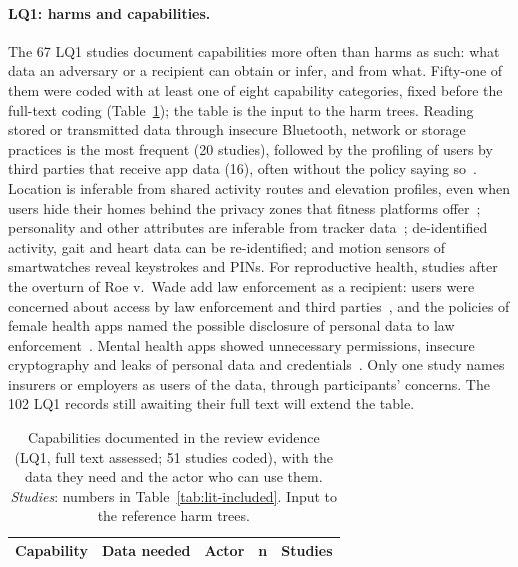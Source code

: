 \paragraph{LQ1: harms and capabilities.} The 67 LQ1 studies document
capabilities more often than harms as such: what data an adversary or a
recipient can obtain or infer, and from what. Fifty-one of them were coded with
at least one of eight capability categories, fixed before the full-text coding
(Table~\ref{tab:lit-capabilities}); the table is the input to the harm trees.
Reading stored or transmitted data through insecure Bluetooth, network or
storage practices is the most frequent (20 studies), followed by the profiling
of users by third parties that receive app data (16), often without the policy
saying
so~\parencite{huckvale2015unaddressed,huckvale2019assessment,grundy2019data,tangari2021mobile}.
Location is inferable from shared activity routes and elevation profiles, even
when users hide their homes behind the privacy zones that fitness platforms
offer~\parencite{hassan2018analysis,dhondt2022run}; personality and other
attributes are inferable from tracker data~\parencite{zufferey2023watch};
de-identified activity, gait and heart data can be re-identified; and motion
sensors of smartwatches reveal keystrokes and PINs. For reproductive health,
studies after the overturn of Roe v.~Wade add law enforcement as a recipient:
users were concerned about access by law enforcement and third
parties~\parencite{cao2024deleted}, and the policies of female health apps named
the possible disclosure of personal data to law
enforcement~\parencite{malki2024exploring}. Mental health apps showed
unnecessary permissions, insecure cryptography and leaks of personal data and
credentials~\parencite{iwaya2023privacy}. Only one study names insurers or
employers as users of the data, through participants' concerns. The 102 LQ1
records still awaiting their full text will extend the table.

\begin{table}[tbp]
\centering
\begin{singlespace}
\caption[Capabilities documented in the review evidence]{Capabilities
documented in the review evidence (LQ1, full text assessed; 51 studies coded),
with the data they need and the actor who can use them. \emph{Studies}: numbers
in Table~\ref{tab:lit-included}. Input to the reference harm trees.}
\label{tab:lit-capabilities}
\footnotesize
\begin{tabularx}{\textwidth}{@{}>{\raggedright\arraybackslash}p{3.6cm}>{\raggedright\arraybackslash}p{3.0cm}>{\raggedright\arraybackslash}p{2.4cm}r>{\raggedright\arraybackslash}X@{}}
\toprule
\textbf{Capability} & \textbf{Data needed} & \textbf{Actor} & \textbf{n} & \textbf{Studies} \\
\midrule
\end{tabularx}
\end{singlespace}
\end{table}

